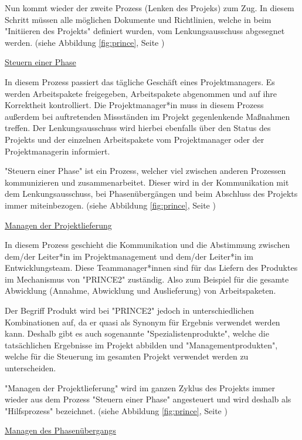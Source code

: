 Nun kommt wieder der zweite Prozess (Lenken des Projeks) zum Zug. In diesem Schritt müssen alle möglichen Dokumente und Richtlinien, welche in beim "Initiieren des Projekts" definiert wurden, vom Lenkungsausschuss abgesegnet werden. (siehe Abbildung \ref{fig:prince}, Seite \pageref{fig:prince}) \cite{Prince2}

\underline{Steuern einer Phase}

In diesem Prozess passiert das tägliche Geschäft eines Projektmanagers. Es werden Arbeitspakete freigegeben, Arbeitspakete abgenommen und auf ihre Korrektheit kontrolliert. Die Projektmanager*in muss in diesem Prozess außerdem bei auftretenden Missständen im Projekt gegenlenkende Maßnahmen treffen. Der Lenkungsausschuss wird hierbei ebenfalls über den Status des Projekts und der einzelnen Arbeitspakete vom Projektmanager oder der Projektmanagerin informiert. \cite{Prince2}

"Steuern einer Phase" ist ein Prozess, welcher viel zwischen anderen Prozessen kommunizieren und zusammenarbeitet. Dieser wird in der Kommunikation mit dem Lenkungsausschuss, bei Phasenübergängen und beim Abschluss des Projekts immer miteinbezogen. (siehe Abbildung \ref{fig:prince}, Seite \pageref{fig:prince}) \cite{Prince2}

\underline{Managen der Projektlieferung}

In diesem Prozess geschieht die Kommunikation und die Abstimmung zwischen dem/der Leiter*in im Projektmanagement und dem/der Leiter*in im Entwicklungsteam. Diese Teammanager*innen sind für das Liefern des Produktes im Mechanismus von "PRINCE2" zuständig. Also zum Beispiel für die gesamte Abwicklung (Annahme, Abwicklung und Auslieferung) von Arbeitspaketen. \cite{Prince2}

Der Begriff Produkt wird bei "PRINCE2" jedoch in unterschiedlichen Kombinationen auf, da er quasi als Synonym für Ergebnis verwendet werden kann. Deshalb gibt es auch sogenannte "Spezialistenprodukte", welche die tatsächlichen Ergebnisse im Projekt abbilden und "Managementprodukten", welche für die Steuerung im gesamten Projekt verwendet werden zu unterscheiden. \cite{Prince2}

"Managen der Projektlieferung" wird im ganzen Zyklus des Projekts immer wieder aus dem Prozess "Steuern einer Phase" angesteuert und wird deshalb als "Hilfsprozess" bezeichnet. (siehe Abbildung \ref{fig:prince}, Seite \pageref{fig:prince}) \cite{Prince2}

\underline{Managen des Phasenübergangs}

